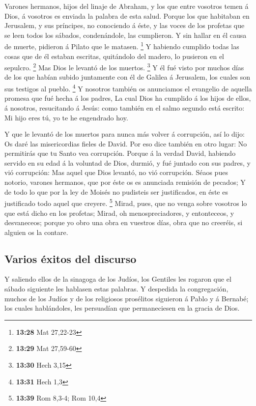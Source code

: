  Varones hermanos, hijos del linaje de Abraham, y los que
entre vosotros temen á Dios, á vosotros es enviada la palabra de esta
salud.  Porque los que habitaban en Jerusalem, y sus
príncipes, no conociendo á éste, y las voces de los profetas que se leen
todos los sábados, condenándole, las cumplieron.  Y sin
hallar en él causa de muerte, pidieron á Pilato que le matasen.
\footnote{\textbf{13:28} Mat 27,22-23}  Y habiendo
cumplido todas las cosas que de él estaban escritas, quitándolo del
madero, lo pusieron en el sepulcro. \footnote{\textbf{13:29} Mat
  27,59-60}  Mas Dios le levantó de los muertos.
\footnote{\textbf{13:30} Hech 3,15}  Y él fué visto por
muchos días de los que habían subido juntamente con él de Galilea á
Jerusalem, los cuales son sus testigos al pueblo. \footnote{\textbf{13:31}
  Hech 1,3}  Y nosotros también os anunciamos el
evangelio de aquella promesa que fué hecha á los padres, 
La cual Dios ha cumplido á los hijos de ellos, á nosotros, resucitando á
Jesús: como también en el salmo segundo está escrito: Mi hijo eres tú,
yo te he engendrado hoy.

 Y que le levantó de los muertos para nunca más volver á
corrupción, así lo dijo: Os daré las misericordias fieles de David.
 Por eso dice también en otro lugar: No permitirás que tu
Santo vea corrupción.  Porque á la verdad David, habiendo
servido en su edad á la voluntad de Dios, durmió, y fué juntado con sus
padres, y vió corrupción:  Mas aquel que Dios levantó, no
vió corrupción.  Séaos pues notorio, varones hermanos,
que por éste os es anunciada remisión de pecados;  Y de
todo lo que por la ley de Moisés no pudisteis ser justificados, en éste
es justificado todo aquel que creyere. \footnote{\textbf{13:39} Rom
  8,3-4; Rom 10,4}  Mirad, pues, que no venga sobre
vosotros lo que está dicho en los profetas;  Mirad, oh
menospreciadores, y entonteceos, y desvaneceos; porque yo obro una obra
en vuestros días, obra que no creeréis, si alguien os la contare.

\hypertarget{varios-uxe9xitos-del-discurso}{%
\subsection{Varios éxitos del
discurso}\label{varios-uxe9xitos-del-discurso}}

 Y saliendo ellos de la sinagoga de los Judíos, los
Gentiles les rogaron que el sábado siguiente les hablasen estas
palabras.  Y despedida la congregación, muchos de los
Judíos y de los religiosos prosélitos siguieron á Pablo y á Bernabé; los
cuales hablándoles, les persuadían que permaneciesen en la gracia de
Dios.

